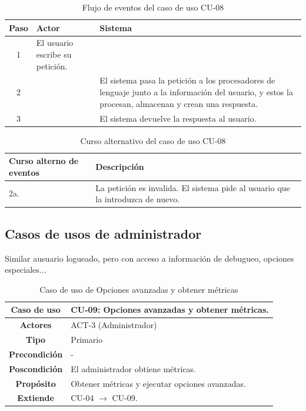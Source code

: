 \begin{table}[H]
\centering
\begin{tabular}{|c|p{5cm}|p{5cm}|}
\hline
\rowcolor{green!40} \textbf{Paso} & \textbf{Actor} & \textbf{Sistema} \\ \hline
\rowcolor{blue!10} 1 & El usuario escribe su petición. &  \\ \hline
\rowcolor{blue!10} 2 &  & El sistema pasa la petición a los procesadores de lenguaje junto a la información del usuario, y estos la procesan, almacenan y crean una respuesta. \\ \hline
\rowcolor{blue!10} 3 &  & El sistema devuelve la respuesta al usuario. \\ \hline
\end{tabular}
\caption{Flujo de eventos del caso de uso CU-08}
\end{table}

\begin{table}[H]
\centering
\begin{tabular}{|p{4cm}|p{8cm}|}
\hline
\rowcolor{green!40} \textbf{Curso alterno de eventos} & \textbf{Descripción} \\ \hline
\rowcolor{blue!10} 2a. & La petición es invalida. El sistema pide  al usuario que la introduzca de nuevo.\\ \hline
\end{tabular}
\caption{Curso alternativo del caso de uso CU-08}
\end{table}
\newpage
\subsection{Casos de usos de administrador}

Similar ausuario logueado, pero con acceso a información de debugueo, opciones especiales...

\begin{table}[H]
\centering
\begin{tabular}{|c|p{10cm}|}
\hline
\rowcolor{green!40} \textbf{Caso de uso} & CU-09: Opciones avanzadas y obtener métricas. \\ \hline
\rowcolor{blue!10} \textbf{Actores} & ACT-3 (Administrador) \\ \hline
\rowcolor{blue!10} \textbf{Tipo} & Primario \\ \hline
\rowcolor{blue!10} \textbf{Precondición} & - \\ \hline
\rowcolor{blue!10} \textbf{Poscondición} & El administrador obtiene métricas. \\ \hline
\rowcolor{blue!10} \textbf{Propósito} & Obtener métricas y ejecutar opciones avanzadas. \\ \hline
\rowcolor{blue!10} \textbf{Extiende} & CU-04 $\rightarrow$ CU-09.\\ \hline
\end{tabular}
\caption{Caso de uso de Opciones avanzadas y obtener métricas}
\end{table}

